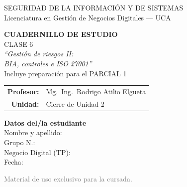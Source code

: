 \documentclass[12pt,a4paper]{article}
\begin{document}
\begin{titlepage}
\centering
\vspace*{1cm}

\begin{cajaTitulo}[width=\textwidth, halign=center]
  SEGURIDAD DE LA INFORMACI\'ON Y DE SISTEMAS\\[4pt]
  {\large Licenciatura en Gesti\'on de Negocios Digitales --- UCA}
\end{cajaTitulo}

\vspace{1.2cm}

{\Huge\bfseries\color{azulUCA} CUADERNILLO DE ESTUDIO}\\[8pt]
{\LARGE\color{doradoUCA} CLASE 6}\\[10pt]
{\Large\itshape ``Gesti\'on de riesgos II:\\[2pt] BIA, controles e ISO 27001''}\\[6pt]
{\large\color{violetaParcial}\; Incluye preparaci\'on para el PARCIAL 1}\\[1.5cm]

\begin{tabular}{rl}
\textbf{Profesor:}   & Mg.\ Ing.\ Rodrigo Atilio Elgueta \\[4pt]
\textbf{Unidad:}     & Cierre de Unidad 2 \\[4pt]
\end{tabular}

\vfill

\begin{tcolorbox}[colback=grisClaro, colframe=azulUCA, arc=3mm, width=0.9\textwidth]
  \centering
  {\bfseries Datos del/la estudiante}\\[10pt]
  Nombre y apellido: \underline{\hspace{5cm}}\\[10pt]
  Grupo N.\textdegree: \underline{\hspace{5cm}}\\[10pt]
  Negocio Digital (TP): \underline{\hspace{5cm}}\\[10pt]
  Fecha: \underline{\hspace{5cm}}
\end{tcolorbox}

\vspace{1cm}
{\small\textcolor{gray}{Material de uso exclusivo para la cursada.}}
\end{titlepage}
\end{document}
